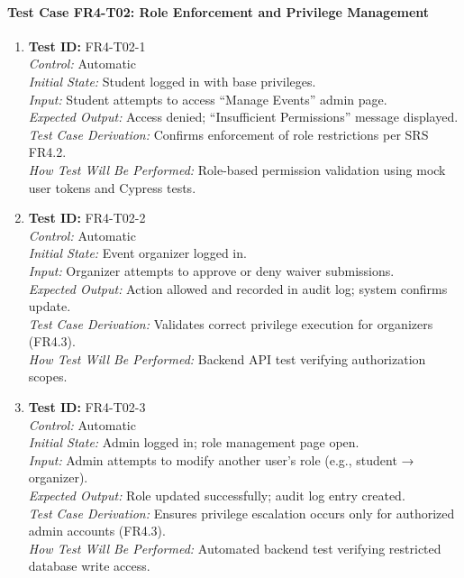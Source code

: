 \documentclass[12pt, titlepage]{article}
\begin{document}
\paragraph{Test Case FR4-T02: Role Enforcement and Privilege Management}

\begin{enumerate}\setlength{\itemsep}{1em}
    \item \textbf{Test ID:} FR4-T02-1\\[0.5em]
    \textit{Control:} Automatic\\[0.3em]
    \textit{Initial State:} Student logged in with base privileges.\\[0.3em]
    \textit{Input:} Student attempts to access “Manage Events” admin page.\\[0.3em]
    \textit{Expected Output:} Access denied; “Insufficient Permissions” message displayed.\\[0.3em]
    \textit{Test Case Derivation:} Confirms enforcement of role restrictions per SRS FR4.2.\\[0.3em]
    \textit{How Test Will Be Performed:} Role-based permission validation using mock user tokens and Cypress tests.

    \item \textbf{Test ID:} FR4-T02-2\\[0.5em]
    \textit{Control:} Automatic\\[0.3em]
    \textit{Initial State:} Event organizer logged in.\\[0.3em]
    \textit{Input:} Organizer attempts to approve or deny waiver submissions.\\[0.3em]
    \textit{Expected Output:} Action allowed and recorded in audit log; system confirms update.\\[0.3em]
    \textit{Test Case Derivation:} Validates correct privilege execution for organizers (FR4.3).\\[0.3em]
    \textit{How Test Will Be Performed:} Backend API test verifying authorization scopes.

    \item \textbf{Test ID:} FR4-T02-3\\[0.5em]
    \textit{Control:} Automatic\\[0.3em]
    \textit{Initial State:} Admin logged in; role management page open.\\[0.3em]
    \textit{Input:} Admin attempts to modify another user’s role (e.g., student → organizer).\\[0.3em]
    \textit{Expected Output:} Role updated successfully; audit log entry created.\\[0.3em]
    \textit{Test Case Derivation:} Ensures privilege escalation occurs only for authorized admin accounts (FR4.3).\\[0.3em]
    \textit{How Test Will Be Performed:} Automated backend test verifying restricted database write access.
\end{enumerate}
\end{document}
